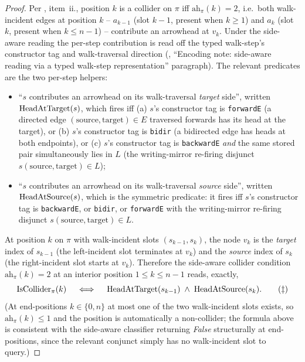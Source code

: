 \documentclass[main]{subfiles}
\begin{document}
\begin{proof}
Per , item~ii., position $k$ is a collider on $\pi$ iff $\mathrm{ah}_\pi(k) = 2$, i.e.\ both walk-incident edges at position $k$ -- $a_{k-1}$ (slot $k - 1$, present when $k \ge 1$) and $a_k$ (slot $k$, present when $k \le n - 1$) -- contribute an arrowhead at $v_k$. Under the side-aware reading the per-step contribution is read off the typed walk-step's constructor tag and walk-traversal direction (, ``Encoding note: side-aware reading via a typed walk-step representation'' paragraph). The relevant predicates are the two per-step helpers:
\begin{itemize}
    \item ``$s$ contributes an arrowhead on its walk-traversal \emph{target} side'', written $\mathrm{HeadAtTarget}(s)$, which fires iff (a) $s$'s constructor tag is \texttt{forwardE} (a directed edge $(\text{source}, \text{target}) \in E$ traversed forwards has its head at the target), or (b) $s$'s constructor tag is \texttt{bidir} (a bidirected edge has heads at both endpoints), or (c) $s$'s constructor tag is \texttt{backwardE} \emph{and} the same stored pair simultaneously lies in $L$ (the writing-mirror re-firing disjunct $s(\text{source}, \text{target}) \in L$);
    \item ``$s$ contributes an arrowhead on its walk-traversal \emph{source} side'', written $\mathrm{HeadAtSource}(s)$, which is the symmetric predicate: it fires iff $s$'s constructor tag is \texttt{backwardE}, or \texttt{bidir}, or \texttt{forwardE} with the writing-mirror re-firing disjunct $s(\text{source}, \text{target}) \in L$.
\end{itemize}
At position $k$ on $\pi$ with walk-incident slots $(s_{k-1}, s_k)$, the node $v_k$ is the \emph{target} index of $s_{k-1}$ (the left-incident slot terminates at $v_k$) and the \emph{source} index of $s_k$ (the right-incident slot starts at $v_k$). Therefore the side-aware collider condition $\mathrm{ah}_\pi(k) = 2$ at an interior position $1 \le k \le n - 1$ reads, exactly,
\begin{equation}
    \mathrm{IsCollider}_\pi(k)
    \quad\iff\quad
    \mathrm{HeadAtTarget}(s_{k-1}) \;\land\; \mathrm{HeadAtSource}(s_k). \tag{$\ddagger$}
\end{equation}
(At end-positions $k \in \{0, n\}$ at most one of the two walk-incident slots exists, so $\mathrm{ah}_\pi(k) \le 1$ and the position is automatically a non-collider; the formula above is consistent with the side-aware classifier returning \emph{False} structurally at end-positions, since the relevant conjunct simply has no walk-incident slot to query.)


\end{proof}
\end{document}
